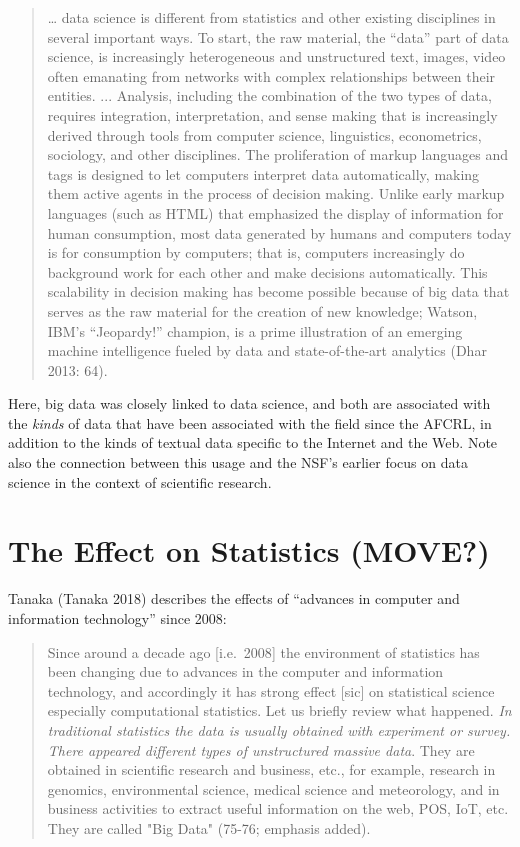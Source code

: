 \documentclass[
  letterpaper,
]{report}
\begin{document}
\begin{quote}
\ldots{} data science is different from statistics and other existing
disciplines in several important ways. To start, the raw material, the
``data'' part of data science, is increasingly heterogeneous and
unstructured text, images, video often emanating from networks with
complex relationships between their entities. ... Analysis, including
the combination of the two types of data, requires integration,
interpretation, and sense making that is increasingly derived through
tools from computer science, linguistics, econometrics, sociology, and
other disciplines. The proliferation of markup languages and tags is
designed to let computers interpret data automatically, making them
active agents in the process of decision making. Unlike early markup
languages (such as HTML) that emphasized the display of information for
human consumption, most data generated by humans and computers today is
for consumption by computers; that is, computers increasingly do
background work for each other and make decisions automatically. This
scalability in decision making has become possible because of big data
that serves as the raw material for the creation of new knowledge;
Watson, IBM's ``Jeopardy!'' champion, is a prime illustration of an
emerging machine intelligence fueled by data and state-of-the-art
analytics (Dhar 2013: 64).
\end{quote}

Here, big data was closely linked to data science, and both are
associated with the \emph{kinds} of data that have been associated with
the field since the AFCRL, in addition to the kinds of textual data
specific to the Internet and the Web. Note also the connection between
this usage and the NSF's earlier focus on data science in the context of
scientific research.

\hypertarget{the-effect-on-statistics-move}{%
\section{The Effect on Statistics
(MOVE?)}\label{the-effect-on-statistics-move}}

Tanaka (Tanaka 2018) describes the effects of ``advances in computer and
information technology'' since 2008:

\begin{quote}
Since around a decade ago {[}i.e.~2008{]} the environment of statistics
has been changing due to advances in the computer and information
technology, and accordingly it has strong effect {[}sic{]} on
statistical science especially computational statistics. Let us briefly
review what happened. \emph{In traditional statistics the data is
usually obtained with experiment or survey. There appeared different
types of unstructured massive data}. They are obtained in scientific
research and business, etc., for example, research in genomics,
environmental science, medical science and meteorology, and in business
activities to extract useful information on the web, POS, IoT, etc. They
are called "Big Data" (75-76; emphasis added).
\end{quote}
\end{document}
